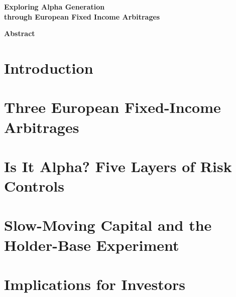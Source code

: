 \documentclass[11pt, oneside, a4paper]{article}
\begin{document}
\begin{titlepage}
  \thispagestyle{empty}
  \setcounter{page}{0}%
  \vspace*{0.32\textheight}
  \begin{center}
    {\LARGE\bfseries Exploring Alpha Generation\\[6pt]
     through European Fixed Income Arbitrages\par}
  \end{center}
  \vfill
\end{titlepage}


\begin{center}\bfseries Abstract\end{center}
\begin{quote}\small

\end{quote}
\medskip

\section{Introduction}\label{sec:intro}


\section{Three European Fixed-Income Arbitrages}\label{sec:strategies}


\section{Is It Alpha? Five Layers of Risk Controls}\label{sec:alpha}%
\label{sec:benchmarks}\label{sec:bench_specs}\label{sec:bench_results}%
\label{sec:factor_selection}\label{sec:factor_universe}\label{sec:pca}%
\label{sec:aen}\label{sec:conditional_alpha}\label{sec:factor_discussion}


\section{Slow-Moving Capital and the Holder-Base Experiment}\label{sec:smc}


\section{Implications for Investors}\label{sec:implications}

\end{document}
